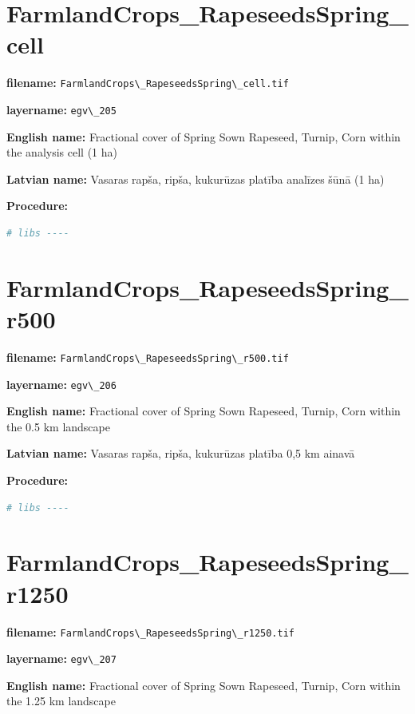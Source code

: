 \documentclass[
]{book}
\newcommand{\passthrough}[1]{#1}
\begin{document}
\section{FarmlandCrops\_RapeseedsSpring\_cell}\label{ch06.205}

\textbf{filename:} \passthrough{\lstinline!FarmlandCrops\_RapeseedsSpring\_cell.tif!}

\textbf{layername:} \passthrough{\lstinline!egv\_205!}

\textbf{English name:} Fractional cover of Spring Sown Rapeseed, Turnip, Corn within the analysis cell (1 ha)

\textbf{Latvian name:} Vasaras rapša, ripša, kukurūzas platība analīzes šūnā (1 ha)

\textbf{Procedure:}

\begin{lstlisting}[language=R]
# libs ----
\end{lstlisting}

\section{FarmlandCrops\_RapeseedsSpring\_r500}\label{ch06.206}

\textbf{filename:} \passthrough{\lstinline!FarmlandCrops\_RapeseedsSpring\_r500.tif!}

\textbf{layername:} \passthrough{\lstinline!egv\_206!}

\textbf{English name:} Fractional cover of Spring Sown Rapeseed, Turnip, Corn within the 0.5 km landscape

\textbf{Latvian name:} Vasaras rapša, ripša, kukurūzas platība 0,5 km ainavā

\textbf{Procedure:}

\begin{lstlisting}[language=R]
# libs ----
\end{lstlisting}

\section{FarmlandCrops\_RapeseedsSpring\_r1250}\label{ch06.207}

\textbf{filename:} \passthrough{\lstinline!FarmlandCrops\_RapeseedsSpring\_r1250.tif!}

\textbf{layername:} \passthrough{\lstinline!egv\_207!}

\textbf{English name:} Fractional cover of Spring Sown Rapeseed, Turnip, Corn within the 1.25 km landscape
\end{document}
